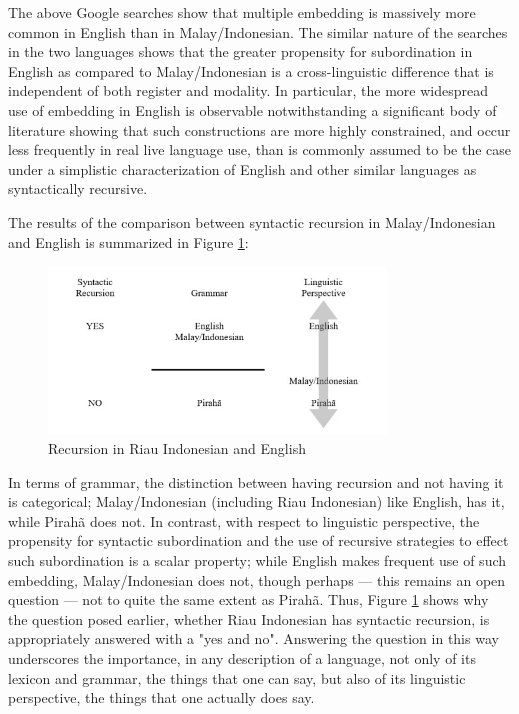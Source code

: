 \documentclass[output=paper,colorlinks,citecolor=brown
]{langscibook}
\begin{document}
The above Google searches show that multiple embedding is massively more common in English than in Malay/Indonesian.  The similar nature of the searches in the two languages shows that the greater propensity for subordination in English as compared to Malay/Indonesian is  a cross-linguistic difference that is independent of both register and modality.  In particular, the more widespread use of embedding in English is observable notwithstanding a significant body of literature \citep{karlsson2007aconstraints,karlsson2007bconstraints,karlsson2009aorigin,karlsson2009bsyntactic} showing that such constructions are more highly constrained, and occur less frequently in real live language use, than is commonly assumed to be the case under a simplistic characterization of English and other similar languages as syntactically recursive.

The results of the comparison between syntactic recursion in Malay/Indonesian and English is summarized in Figure \ref{fig:fig5}:

\begin{figure}[hbt!]
\centering
\includegraphics[width=0.8\textwidth]{gil_figure5.png}
\caption{\label{fig:fig5}Recursion in Riau Indonesian and English}
\end{figure}

In terms of grammar, the distinction between having recursion and not having it is categorical; Malay/Indonesian (including Riau Indonesian) like English, has it, while Pirahã does not.  In contrast, with respect to linguistic perspective, the propensity for syntactic subordination and the use of recursive strategies to effect such subordination is a scalar property; while English makes frequent use of such embedding, Malay/Indonesian does not, though perhaps — this remains an open question — not to quite the same extent as Pirahã.  Thus, Figure \ref{fig:fig5} shows why the question posed earlier, whether Riau Indonesian has syntactic recursion, is appropriately answered with a "yes and no".  Answering the question in this way underscores the importance, in any description of a language, not only of its lexicon and grammar, the things that one can say, but also of its linguistic perspective, the things that one actually does say.
\end{document}

